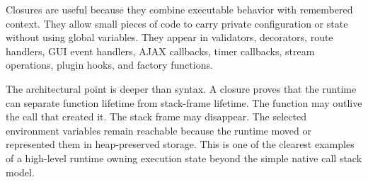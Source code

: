 Closures are useful because they combine executable behavior with remembered context. They allow small pieces of code to carry private configuration or state without using global variables. They appear in validators, decorators, route handlers, GUI event handlers, AJAX callbacks, timer callbacks, stream operations, plugin hooks, and factory functions.

The architectural point is deeper than syntax. A closure proves that the runtime can separate function lifetime from stack-frame lifetime. The function may outlive the call that created it. The stack frame may disappear. The selected environment variables remain reachable because the runtime moved or represented them in heap-preserved storage. This is one of the clearest examples of a high-level runtime owning execution state beyond the simple native call stack model.


